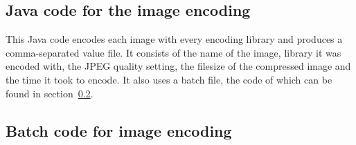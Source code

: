 \documentclass[12pt]{article}
\begin{document}
\subsection{Java code for the image encoding}\label{javacode}
This Java code encodes each image with every encoding library and produces a comma-separated value file. It consists of the name of the image, library it was encoded with, the JPEG quality setting, the filesize of the compressed image and the time it took to encode. It also uses a batch file, the code of which can be found in section~\ref{batchcode}.

\lstset{style=codestyle}
{
	
}

\subsection{Batch code for image encoding}\label{batchcode}
{
	
}
\end{document}
